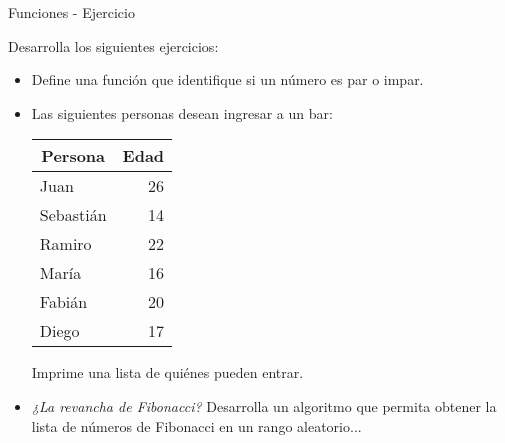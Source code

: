 \begin{frame}[t]{Funciones - Ejercicio}\vspace{10pt}

Desarrolla los siguientes ejercicios:

\begin{itemize}
	\item Define una función que identifique si un número es par o impar.
	\item Las siguientes personas desean ingresar a un bar:
	\begin{table}[h!]
\begin{tabular}{|l|r|}
\hline
\multicolumn{1}{|c|}{\textbf{Persona}} & \multicolumn{1}{c|}{\textbf{Edad}} \\ \hline
Juan                                   & 26            \\ \hline
Sebasti\'an                              & 14                                 \\ \hline
Ramiro                                 & 22                                 \\ \hline
Mar\'ia                                  & 16                                 \\ \hline
Fabi\'an                                 & 20                                 \\ \hline
Diego                                 & 17                                \\ \hline
\end{tabular}
\end{table}
	Imprime una lista de quiénes pueden entrar.
	\item \textit{¿La revancha de Fibonacci?} Desarrolla un algoritmo que permita obtener la lista de números de Fibonacci en un rango aleatorio...
\end{itemize}

\end{frame}